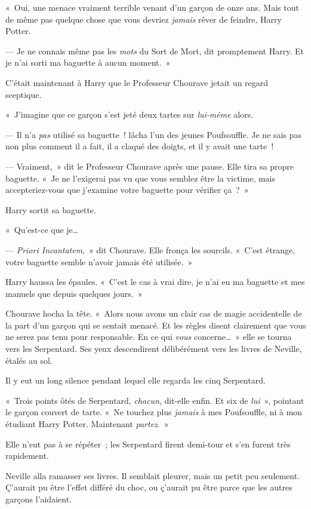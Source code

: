 «~Oui, une menace vraiment terrible venant d'un garçon de onze ans. Mais tout de même pas quelque chose que vous devriez \emph{jamais} rêver de feindre, Harry Potter.

--- Je ne connais même pas les \emph{mots} du Sort de Mort, dit promptement Harry. Et je n'ai sorti ma baguette à aucun moment.~»

C'était maintenant à Harry que le Professeur Chourave jetait un regard sceptique.

«~J'imagine que ce garçon s'est jeté deux tartes sur \emph{lui-même} alors.

--- Il n'a \emph{pas} utilisé sa baguette~! lâcha l'un des jeunes Poufsouffle. Je ne sais pas non plus comment il a fait, il a claqué des doigts, et il y avait une tarte~!

--- Vraiment,~» dit le Professeur Chourave après une pause. Elle tira sa propre baguette. «~Je ne l'exigerai pas vu que vous semblez être la victime, mais accepteriez-vous que j'examine votre baguette pour vérifier ça~?~»

Harry sortit sa baguette.

«~Qu'est-ce que je…

--- \emph{Priori Incantatem},~» dit Chourave. Elle fronça les sourcils. «~C'est étrange, votre baguette semble n'avoir jamais été utilisée.~»

Harry haussa les épaules. «~C'est le cas à vrai dire, je n'ai eu ma baguette et mes manuels que depuis quelques jours.~»

Chourave hocha la tête. «~Alors nous avons un clair cas de magie accidentelle de la part d'un garçon qui se sentait menacé. Et les règles disent clairement que vous ne serez pas tenu pour responsable. En ce qui \emph{vous} concerne…~» elle se tourna vers les Serpentard. Ses yeux descendirent délibérément vers les livres de Neville, étalés au sol.

Il y eut un long silence pendant lequel elle regarda les cinq Serpentard.

«~Trois points ôtés de Serpentard, \emph{chacun}, dit-elle enfin. Et six de \emph{lui}~», pointant le garçon couvert de tarte. «~Ne touchez plus \emph{jamais} à mes Poufsouffle, ni à mon étudiant Harry Potter. Maintenant \emph{partez}.~»

Elle n'eut pas à se répéter~; les Serpentard firent demi-tour et s'en furent très rapidement.

Neville alla ramasser ses livres. Il semblait pleurer, mais un petit peu seulement. Ç'aurait pu être l'effet différé du choc, ou ç'aurait pu être parce que les autres garçons l'aidaient.

